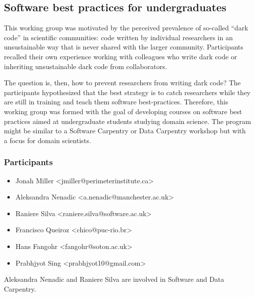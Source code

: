 \subsection{Software best practices for undergraduates}
\label{sec:best-practices-undergrads}



This working group was motivated by the perceived prevalence of
so-called ``dark code'' in scientific communities: code written by
individual researchers in an unsustainable way that is never shared
with the larger community. Participants recalled their own experience
working with colleagues who write dark code or inheriting
unsustainable dark code from collaborators.

The question is, then, how to prevent researchers from writing dark
code? The participants hypothesized that the best strategy is to catch
researchers while they are still in training and teach them software
best-practices. Therefore, this working group was formed with the goal
of developing courses on software best practices aimed at
undergraduate students studying domain science. The program might be
similar to a Software Carpentry or Data Carpentry workshop but with a
focus for domain scientists.

\subsubsection{Participants}

\begin{itemize}
  \item Jonah Miller <jmiller@perimeterinstitute.ca>
  \item Aleksandra Nenadic <a.nenadic@manchester.ac.uk>
  \item Raniere Silva <raniere.silva@software.ac.uk>
  \item Francisco Queiroz <chico@puc-rio.br>
  \item Hans Fangohr <fangohr@soton.ac.uk>
  \item Prabhjyot Sing <prabhjyot10@gmail.com>
\end{itemize}

\noindent Aleksandra Nenadic and Raniere Silva are involved
in Software and Data Carpentry.

